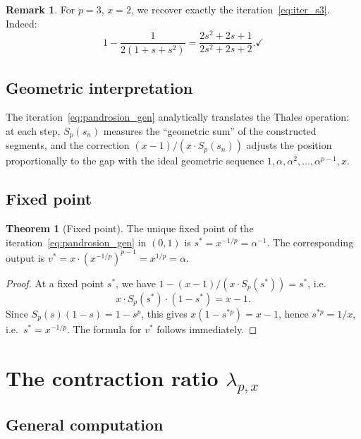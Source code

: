 \documentclass[11pt,a4paper]{article}
\theoremstyle{definition}
\newtheorem{theorem}{Theorem}[section]
\newtheorem{remark}{Remark}[section]
\begin{document}
\begin{remark}
For $p = 3$, $x = 2$, we recover exactly the iteration~\eqref{eq:iter_s3}. Indeed:
\[
  1 - \frac{1}{2(1+s+s^2)} = \frac{2s^2+2s+1}{2s^2+2s+2}. \checkmark
\]
\end{remark}

\subsection{Geometric interpretation}

The iteration~\eqref{eq:pandrosion_gen} analytically translates the Thales operation: at each step, $S_p(s_n)$ measures the ``geometric sum'' of the constructed segments, and the correction $(x-1)/(x \cdot S_p(s_n))$ adjusts the position proportionally to the gap with the ideal geometric sequence $1, \alpha, \alpha^2, \ldots, \alpha^{p-1}, x$.

\subsection{Fixed point}

\begin{theorem}[Fixed point]
\label{thm:fixed_point}
The unique fixed point of the iteration~\eqref{eq:pandrosion_gen} in $(0,1)$ is $s^* = x^{-1/p} = \alpha^{-1}$. The corresponding output is $v^* = x \cdot (x^{-1/p})^{p-1} = x^{1/p} = \alpha$.
\end{theorem}

\begin{proof}
At a fixed point $s^*$, we have $1 - (x-1)/(x \cdot S_p(s^*)) = s^*$, i.e.\
\[
  x \cdot S_p(s^*) \cdot (1 - s^*) = x - 1.
\]
Since $S_p(s)(1-s) = 1 - s^p$, this gives $x(1 - s^{*p}) = x - 1$, hence $s^{*p} = 1/x$, i.e.\ $s^* = x^{-1/p}$. The formula for $v^*$ follows immediately.
\end{proof}

\section{The contraction ratio \texorpdfstring{$\lambda_{p,x}$}{lambda}}
\label{sec:coefficient}

\subsection{General computation}
\end{document}

